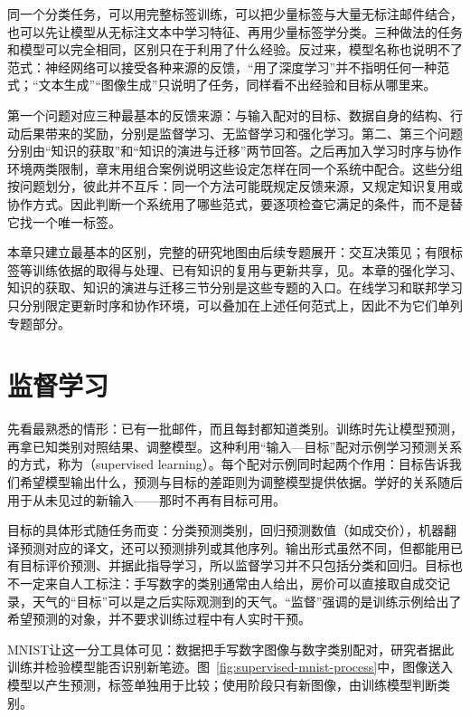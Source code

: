 同一个分类任务，可以用完整标签训练，可以把少量标签与大量无标注邮件结合，也可以先让模型从无标注文本中学习特征、再用少量标签学分类。三种做法的任务和模型可以完全相同，区别只在于利用了什么经验。反过来，模型名称也说明不了范式：神经网络可以接受各种来源的反馈，“用了深度学习”并不指明任何一种范式；“文本生成”“图像生成”只说明了任务，同样看不出经验和目标从哪里来。

第一个问题对应三种最基本的反馈来源：与输入配对的目标、数据自身的结构、行动后果带来的奖励，分别是监督学习、无监督学习和强化学习。第二、第三个问题分别由“知识的获取”和“知识的演进与迁移”两节回答。之后再加入学习时序与协作环境两类限制，章末用组合案例说明这些设定怎样在同一个系统中配合。这些分组按问题划分，彼此并不互斥：同一个方法可能既规定反馈来源，又规定知识复用或协作方式。因此判断一个系统用了哪些范式，要逐项检查它满足的条件，而不是替它找一个唯一标签。

本章只建立最基本的区别，完整的研究地图由后续专题展开：交互决策见；有限标签等训练依据的取得与处理、已有知识的复用与更新共享，见。本章的强化学习、知识的获取、知识的演进与迁移三节分别是这些专题的入口。在线学习和联邦学习只分别限定更新时序和协作环境，可以叠加在上述任何范式上，因此不为它们单列专题部分。

\section{监督学习}
\label{sec:supervised-learning}

先看最熟悉的情形：已有一批邮件，而且每封都知道类别。训练时先让模型预测，再拿已知类别对照结果、调整模型。这种利用“输入—目标”配对示例学习预测关系的方式，称为（supervised learning）。每个配对示例同时起两个作用：目标告诉我们希望模型输出什么，预测与目标的差距则为调整模型提供依据。学好的关系随后用于从未见过的新输入——那时不再有目标可用。

目标的具体形式随任务而变：分类预测类别，回归预测数值（如成交价），机器翻译预测对应的译文，还可以预测排列或其他序列。输出形式虽然不同，但都能用已有目标评价预测、并据此指导学习，所以监督学习并不只包括分类和回归。目标也不一定来自人工标注：手写数字的类别通常由人给出，房价可以直接取自成交记录，天气的“目标”可以是之后实际观测到的天气。“监督”强调的是训练示例给出了希望预测的对象，并不要求训练过程中有人实时干预。

MNIST让这一分工具体可见：数据把手写数字图像与数字类别配对，研究者据此训练并检验模型能否识别新笔迹。图~\ref{fig:supervised-mnist-process}中，图像送入模型以产生预测，标签单独用于比较；使用阶段只有新图像，由训练模型判断类别。

